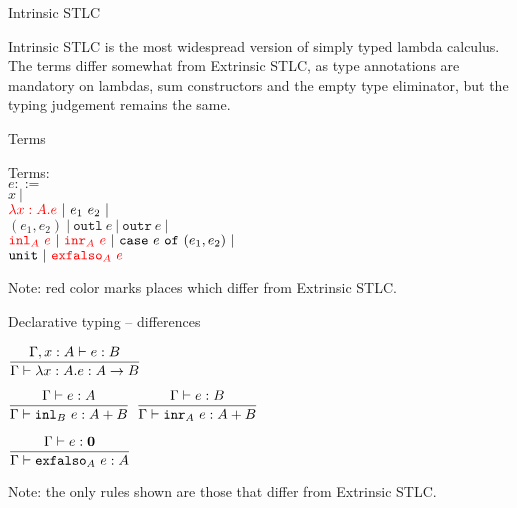 \documentclass{beamer}
\newcommand{\pipe}{\ |\ }
\newcommand{\Fun}[2]{#1 \to #2}
\newcommand{\Sum}[2]{#1 + #2}
\newcommand{\Empty}{\textbf{0}}
\newcommand{\app}[2]{#1\ #2}
\newcommand{\pair}[2]{(#1, #2)}
\newcommand{\outl}[1]{\texttt{outl}\ #1}
\newcommand{\outr}[1]{\texttt{outr}\ #1}
\newcommand{\case}[3]{\texttt{case}\ #1\ \texttt{of}\ (#2, #3)}
\newcommand{\unit}{\texttt{unit}}
\newcommand{\fulltyping}[3]{#1 \vdash #2 : #3}
\newcommand{\typing}[2]{\fulltyping{\Gamma}{#1}{#2}}
\newcommand{\rulename}[1]{\textsc{\footnotesize{#1}}}
\newcommand{\infrule}[3][]{\displaystyle \frac{#2}{#3} \rulename{#1}}
\newcommand{\extend}[3]{#1, #2 : #3}
\begin{document}
\begin{frame}{Intrinsic STLC}

Intrinsic STLC is the most widespread version of simply typed lambda calculus. The terms differ somewhat from Extrinsic STLC, as type annotations are mandatory on lambdas, sum constructors and the empty type eliminator, but the typing judgement remains the same.

\end{frame}

\begin{frame}{Terms}

Terms: \\
$e ::=$ \\
\qquad $x \pipe$ \\
\qquad $\termdiff{\ifun{x}{A}{e}} \pipe \app{e_1}{e_2} \pipe$ \\
\qquad $\pair{e_1}{e_2} \pipe \outl{e} \pipe \outr{e} \pipe$ \\
\qquad $\termdiff{\iinl{A}{e}} \pipe \termdiff{\iinr{A}{e}} \pipe \case{e}{e_1}{e_2} \pipe$ \\
\qquad $\unit \pipe \termdiff{\iexfalso{A}{e}}$

\vspace{2em}

Note: red color marks places which differ from Extrinsic STLC.

\end{frame}

\begin{frame}{Declarative typing -- differences}

\begin{center}
  $\infrule{\fulltyping{\extend{\Gamma}{x}{A}}{e}{B}}{\typing{\ifun{x}{A}{e}}{\Fun{A}{B}}}$

  \vspace{2em}

  $\infrule{\typing{e}{A}}{\typing{\iinl{B}{e}}{\Sum{A}{B}}}$ \quad
  $\infrule{\typing{e}{B}}{\typing{\iinr{A}{e}}{\Sum{A}{B}}}$

  \vspace{2em}

  $\infrule{\typing{e}{\Empty}}{\typing{\iexfalso{A}{e}}{A}}$
\end{center}

\vspace{2em}

Note: the only rules shown are those that differ from Extrinsic STLC.

\end{frame}
\end{document}
